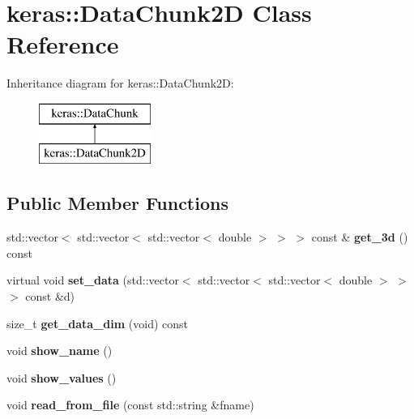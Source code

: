 \hypertarget{classkeras_1_1_data_chunk2_d}{}\section{keras\+:\+:Data\+Chunk2D Class Reference}
\label{classkeras_1_1_data_chunk2_d}
Inheritance diagram for keras\+:\+:Data\+Chunk2D\+:\begin{figure}[H]
\begin{center}
\leavevmode
\includegraphics[height=2.000000cm]{classkeras_1_1_data_chunk2_d}
\end{center}
\end{figure}
\subsection*{Public Member Functions}
\begin{DoxyCompactItemize}
\item 
\mbox{\label{classkeras_1_1_data_chunk2_d_a03f0b33431723553f2bd05c269d7810f}} 
std\+::vector$<$ std\+::vector$<$ std\+::vector$<$ double $>$ $>$ $>$ const  \& {\bfseries get\+\_\+3d} () const
\item 
\mbox{\label{classkeras_1_1_data_chunk2_d_a0a7d7f06553ba90b74a58f12b359dc9e}} 
virtual void {\bfseries set\+\_\+data} (std\+::vector$<$ std\+::vector$<$ std\+::vector$<$ double $>$ $>$ $>$ const \&d)
\item 
\mbox{\label{classkeras_1_1_data_chunk2_d_ac4885f22989d224da813c5b167f3a477}} 
size\+\_\+t {\bfseries get\+\_\+data\+\_\+dim} (void) const
\item 
\mbox{\label{classkeras_1_1_data_chunk2_d_a177b3b6088e27c39533dea11c044a7a2}} 
void {\bfseries show\+\_\+name} ()
\item 
\mbox{\label{classkeras_1_1_data_chunk2_d_aafff6d495c32e21a807c27990f885dea}} 
void {\bfseries show\+\_\+values} ()
\item 
\mbox{\label{classkeras_1_1_data_chunk2_d_aaa4e45d73ca87908a0948e4b620b0fb3}} 
void {\bfseries read\+\_\+from\+\_\+file} (const std\+::string \&fname)
\end{DoxyCompactItemize}
